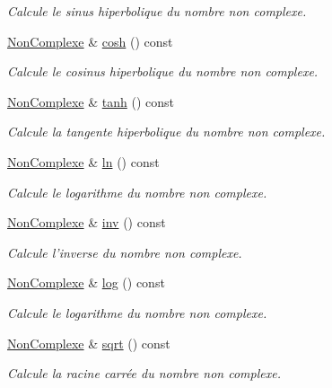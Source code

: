 \begin{DoxyCompactItemize}
\begin{DoxyCompactList}\small\item\em \-Calcule le sinus hiperbolique du nombre non complexe. \end{DoxyCompactList}\item 
\hyperlink{classNonComplexe}{\-Non\-Complexe} \& \hyperlink{classNonComplexe_a3f24a0e8d18159aee3a04c464b99a2e6}{cosh} () const 
\begin{DoxyCompactList}\small\item\em \-Calcule le cosinus hiperbolique du nombre non complexe. \end{DoxyCompactList}\item 
\hyperlink{classNonComplexe}{\-Non\-Complexe} \& \hyperlink{classNonComplexe_a6f52bc836c518adaba10464adbeb6c34}{tanh} () const 
\begin{DoxyCompactList}\small\item\em \-Calcule la tangente hiperbolique du nombre non complexe. \end{DoxyCompactList}\item 
\hyperlink{classNonComplexe}{\-Non\-Complexe} \& \hyperlink{classNonComplexe_abb6c6f03a84dfc34ee0765bd0f2e3819}{ln} () const 
\begin{DoxyCompactList}\small\item\em \-Calcule le logarithme du nombre non complexe. \end{DoxyCompactList}\item 
\hyperlink{classNonComplexe}{\-Non\-Complexe} \& \hyperlink{classNonComplexe_ad767b7dbc48a0ba68e4bc4470433ed23}{inv} () const 
\begin{DoxyCompactList}\small\item\em \-Calcule l'inverse du nombre non complexe. \end{DoxyCompactList}\item 
\hyperlink{classNonComplexe}{\-Non\-Complexe} \& \hyperlink{classNonComplexe_a9edb82d1b81fa55756bb2b4f3c19570b}{log} () const 
\begin{DoxyCompactList}\small\item\em \-Calcule le logarithme du nombre non complexe. \end{DoxyCompactList}\item 
\hyperlink{classNonComplexe}{\-Non\-Complexe} \& \hyperlink{classNonComplexe_a08f4b861f175730b81be376d8f30dcfa}{sqrt} () const 
\begin{DoxyCompactList}\small\item\em \-Calcule la racine carrée du nombre non complexe. \end{DoxyCompactList}\item 

\end{DoxyCompactItemize}
